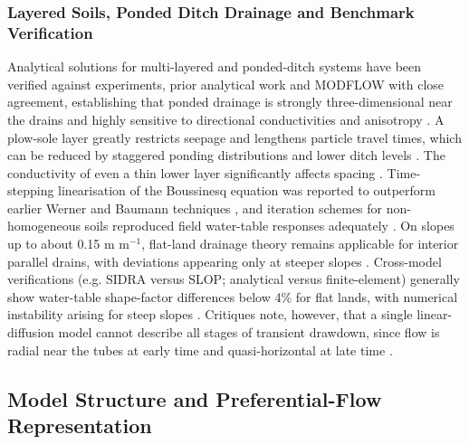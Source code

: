 \documentclass[11pt]{article}
\begin{document}
\subsubsection{Layered Soils, Ponded Ditch Drainage and Benchmark Verification}

Analytical solutions for multi-layered and ponded-ditch systems have been verified against experiments, prior analytical work and MODFLOW with close agreement, establishing that ponded drainage is strongly three-dimensional near the drains and highly sensitive to directional conductivities and anisotropy \parencite{Chakrabarti2020,Sarmah2015,SHARMA1991,Afruzi2014}. A plow-sole layer greatly restricts seepage and lengthens particle travel times, which can be reduced by staggered ponding distributions and lower ditch levels \parencite{Chakrabarti2020,Sarmah2015}. The conductivity of even a thin lower layer significantly affects spacing \parencite{SHARMA1991}. Time-stepping linearisation of the Boussinesq equation was reported to outperform earlier Werner and Baumann techniques \parencite{Lin2025}, and iteration schemes for non-homogeneous soils reproduced field water-table responses adequately \parencite{CHU1977}. On slopes up to about 0.15 m m$^{-1}$, flat-land drainage theory remains applicable for interior parallel drains, with deviations appearing only at steeper slopes \parencite{FIPPS1989}. Cross-model verifications (e.g. SIDRA versus SLOP; analytical versus finite-element) generally show water-table shape-factor differences below 4\% for flat lands, with numerical instability arising for steep slopes \parencite{LORRE1994,Nédélec2010}. Critiques note, however, that a single linear-diffusion model cannot describe all stages of transient drawdown, since flow is radial near the tubes at early time and quasi-horizontal at late time \parencite{Kacimov2000}.

\subsection{Model Structure and Preferential-Flow Representation}
\end{document}
